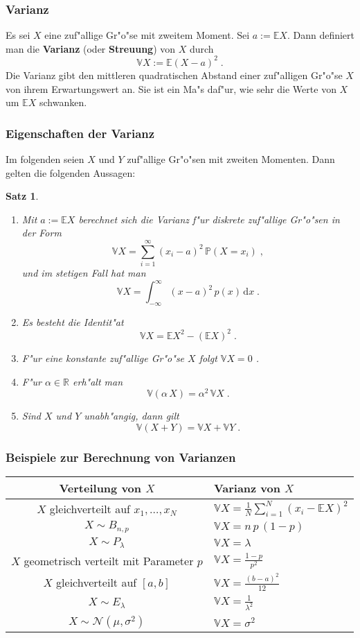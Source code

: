 \documentclass[ngerman,draft,parskip=half,twoside]{scrartcl}
\newtheorem{thm}{Satz}[section]
\newcommand*{\R}{\mathbb{R}}      %
\newcommand*{\E}{\mathbb{E}}        %
\newcommand*{\V}{\mathbb{V}}        %
\newcommand*{\WKM}{\mathbb{P}}      %
\begin{document}
\subsubsection{Varianz}
Es sei $X$ eine zuf"allige Gr"o"se mit zweitem Moment. Sei $a:=\E X$. Dann definiert man
die \textbf{Varianz} (oder \textbf{Streuung}) von $X$ durch
$$
\V X:= \E(X-a)^2\;.
$$
Die Varianz gibt den mittleren quadratischen Abstand einer zuf"alligen Gr"o"se $X$ von ihrem
Erwartungswert an. Sie ist ein Ma"s daf"ur, wie sehr die Werte von $X$ um $\E X$ schwanken.

\subsubsection{Eigenschaften der Varianz}
Im folgenden seien $X$ und $Y$ zuf"allige Gr"o"sen mit zweiten Momenten. Dann gelten die
folgenden Aussagen$\colon$
\begin{thm}~
\begin{enumerate}
\item
Mit $a:=\E X$ berechnet sich die Varianz f"ur diskrete zuf"allige Gr"o"sen in der Form
$$
\V X = \sum_{i=1}^\infty (x_i-a)^2\,\WKM(X=x_i)\;,
$$
und im stetigen Fall hat man
$$
\V X =\int_{-\infty}^\infty (x-a)^2\,p(x)\,\mathrm d x\;.
$$
\item
Es besteht die Identit"at
$$
\V X = \E X^2 -(\E X)^2\;.
$$
\item
F"ur eine konstante zuf"allige Gr"o"se $X$ folgt $\V X=0$ .
\item
F"ur $\alpha\in\R$ erh"alt man
$$
\V(\alpha\,X)=\alpha^2\,\V X\;.
$$
\item
Sind $X$ und $Y$ unabh"angig, dann gilt
$$
\V(X+Y)=\V X + \V Y\;.
$$
\end{enumerate}

\end{thm}
\subsubsection{Beispiele zur Berechnung von Varianzen}

\medskip

{\renewcommand{\arraystretch}{1.4}
\begin{center}
\begin{tabular}{|c|l|}\hline
\bf Verteilung von $X$& \bf Varianz von $X$\\ \hline\hline
$X$ gleichverteilt auf $x_1,\ldots,x_N$& $\V X=\frac{1}{N}\sum_{i=1}^N (x_i-\E X)^2$\\ \hline
$X\sim B_{n,p}$& $\V X= n\,p\,(1-p)$\\ \hline
$X\sim P_\lambda$&$\V X= \lambda$\\ \hline
$X$ geometrisch verteilt mit Parameter $p$& $\V X = \frac{1-p}{p^2}$\\ \hline
$X$ gleichverteilt auf $[a,b]$& $\V X= \frac{(b-a)^2}{12}$\\ \hline
$X\sim E_\lambda$& $\V X = \frac{1}{\lambda^2}$\\ \hline
$X\sim \mathcal N(\mu,\sigma^2)$&$ \V X = \sigma^2$\\ \hline
\end{tabular}
\end{center}
}
\end{document}
